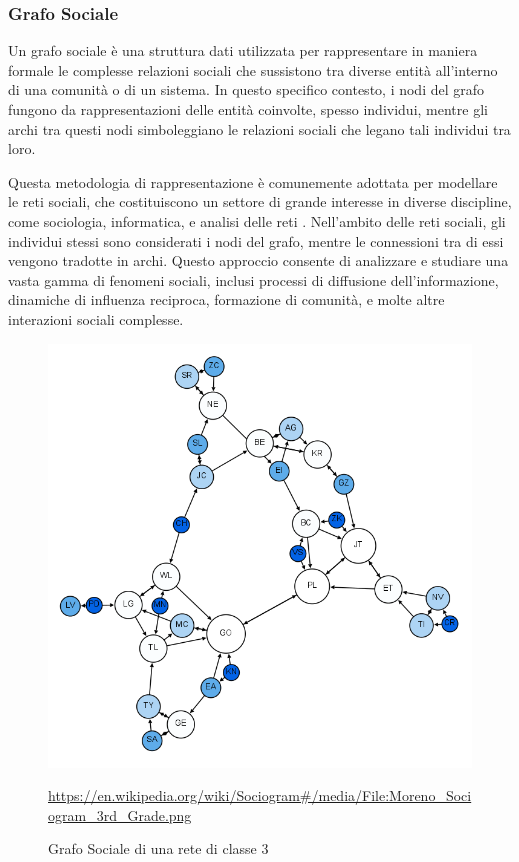 \subsubsection*{Grafo Sociale}

Un grafo sociale è una struttura dati utilizzata per rappresentare in 
maniera formale le complesse relazioni sociali che sussistono tra diverse 
entità all'interno di una comunità o di un sistema. In questo specifico 
contesto, i nodi del grafo fungono da rappresentazioni delle entità 
coinvolte, spesso individui, mentre gli archi tra questi nodi 
simboleggiano le relazioni sociali che legano tali individui tra loro.

Questa metodologia di rappresentazione è comunemente adottata per 
modellare le reti sociali, che costituiscono un settore di grande 
interesse in diverse discipline, come sociologia, informatica, e analisi 
delle reti \cite{doi:10.1126/science.1165821} \cite{doi:10.1177/009430610803700308} \cite{deNooy2012}. Nell'ambito delle reti sociali, gli individui stessi sono 
considerati i nodi del grafo, mentre le connessioni tra di essi vengono 
tradotte in archi. Questo approccio consente di analizzare e studiare 
una vasta gamma di fenomeni sociali, inclusi processi di diffusione 
dell'informazione, dinamiche di influenza reciproca, 
formazione di comunità, e molte altre interazioni sociali complesse.

\begin{figure}[H]
    \begin{center}
		\includegraphics[scale=0.6]{img/Moreno_Sociogram_3rd_Grade.png}
		\caption{Grafo Sociale di una rete di classe 3}
		\url{https://en.wikipedia.org/wiki/Sociogram#/media/File:Moreno_Sociogram_3rd_Grade.png}
		\label{fig:social_graph}
		\end{center}
\end{figure}

